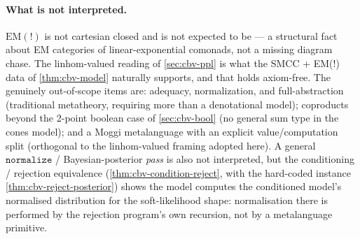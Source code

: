 \paragraph{What is not interpreted.}
$\mathrm{EM}(\mathord{!})$ is not cartesian closed and is not expected
to be --- a structural fact about EM categories of linear-exponential
comonads, not a missing diagram chase. The linhom-valued reading of
\autoref{sec:cbv-ppl} is what the SMCC + EM(!) data of
\autoref{thm:cbv-model} naturally supports, and that holds axiom-free.
The genuinely out-of-scope items are: adequacy, normalization, and
full-abstraction (traditional metatheory, requiring more than a
denotational model); coproducts beyond the 2-point boolean case of
\autoref{sec:cbv-bool} (no general sum type in the cones model); and a
Moggi metalanguage with an explicit value/computation split
(orthogonal to the linhom-valued framing adopted here). A general
$\mathtt{normalize}$ / Bayesian-posterior \emph{pass} is also not
interpreted, but the conditioning / rejection equivalence
(\autoref{thm:cbv-condition-reject}, with the hard-coded instance
\autoref{thm:cbv-reject-posterior}) shows the model computes the
conditioned model's normalised distribution for the soft-likelihood
shape: normalisation there is performed by the rejection program's
own recursion, not by a metalanguage primitive.
